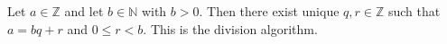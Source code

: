 Let $a \in \mathbb{Z}$ and let $b \in \mathbb{N}$ with $b > 0$.
Then there exist unique $q, r \in \mathbb{Z}$ such that $a = bq + r$ and $0 \leq r < b$.
This is the division algorithm.